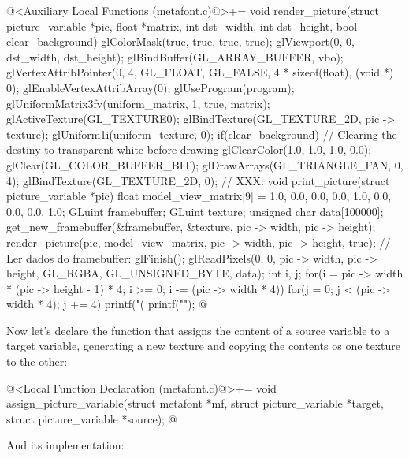 {{{{{\iniciocodigo
@<Auxiliary Local Functions (metafont.c)@>+=
void render_picture(struct picture_variable *pic, float *matrix, int dst_width,
                    int dst_height, bool clear_background){
  glColorMask(true, true, true, true);
  glViewport(0, 0, dst_width, dst_height);
  glBindBuffer(GL_ARRAY_BUFFER, vbo);
  glVertexAttribPointer(0, 4, GL_FLOAT, GL_FALSE, 4 * sizeof(float), (void *) 0);
  glEnableVertexAttribArray(0);
  glUseProgram(program);
  glUniformMatrix3fv(uniform_matrix, 1, true, matrix);
  glActiveTexture(GL_TEXTURE0);
  glBindTexture(GL_TEXTURE_2D, pic -> texture);
  glUniform1i(uniform_texture, 0);
  if(clear_background){
    // Clearing the destiny to transparent white before drawing
    glClearColor(1.0, 1.0, 1.0, 0.0);
    glClear(GL_COLOR_BUFFER_BIT);
  }
  glDrawArrays(GL_TRIANGLE_FAN, 0, 4);
  glBindTexture(GL_TEXTURE_2D, 0);
}
// XXX:
void print_picture(struct picture_variable *pic){
  float model_view_matrix[9] = {1.0, 0.0, 0.0,
                               0.0, 1.0, 0.0,
                               0.0, 0.0, 1.0};
  GLuint framebuffer;
  GLuint texture;
  unsigned char data[100000];
  get_new_framebuffer(&framebuffer, &texture, pic -> width, pic -> height);
  render_picture(pic, model_view_matrix, pic -> width, pic -> height, true);
  // Ler dados do framebuffer:
  glFinish();
  glReadPixels(0, 0, pic -> width, pic -> height, GL_RGBA, GL_UNSIGNED_BYTE, data);
  {
    int i, j;
    for(i = pic -> width * (pic -> height - 1) * 4;
        i >= 0; i -= (pic -> width * 4)){
      for(j = 0; j < (pic -> width * 4); j += 4)
        printf("(%
        printf("\n");
    }
  }
}
@
\fimcodigo

Now let's declare the function that assigns the content of a source
variable to a target variable, generating a new texture and copying
the contents os one texture to the other:

\iniciocodigo
@<Local Function Declaration (metafont.c)@>+=
void assign_picture_variable(struct metafont *mf,
                             struct picture_variable *target,
                             struct picture_variable *source);
@
\fimcodigo

And its implementation:

}}}}}
